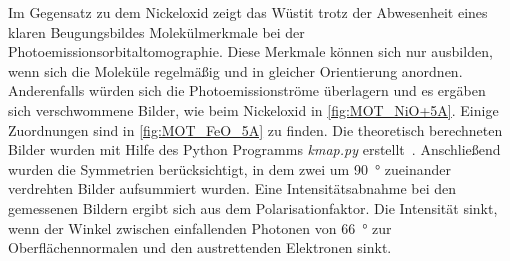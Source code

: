         Im Gegensatz zu dem Nickeloxid zeigt das Wüstit trotz der Abwesenheit eines klaren Beugungsbildes Molekülmerkmale bei der Photoemissionsorbitaltomographie.
        Diese Merkmale können sich nur ausbilden, wenn sich die Moleküle regelmäßig und in gleicher Orientierung anordnen.
        Anderenfalls würden sich die Photoemissionströme überlagern und es ergäben sich verschwommene Bilder, wie beim Nickeloxid in \autoref{fig:MOT_NiO+5A}.
        Einige Zuordnungen sind in \autoref{fig:MOT_FeO_5A} zu finden.
        Die theoretisch berechneten Bilder wurden mit Hilfe des Python Programms \textit{kmap.py} erstellt~\cite{brandstetter_kmappy_2021}.
        Anschließend wurden die Symmetrien berücksichtigt, in dem zwei um \SI{90}{\degree} zueinander verdrehten Bilder aufsummiert wurden.
        Eine Intensitätsabnahme bei den gemessenen Bildern ergibt sich aus dem Polarisationfaktor.
        Die Intensität sinkt, wenn der Winkel zwischen einfallenden Photonen von \SI{66}{\degree} zur Oberflächennormalen und den austrettenden Elektronen sinkt.

